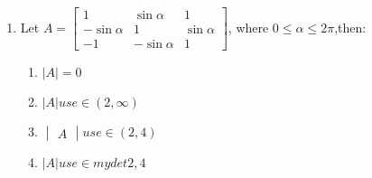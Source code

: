 \documentclass{article}
\providecommand{\myvec}[1]{\begin{bmatrix}#1\end{bmatrix}}
\providecommand{\mydet}[1]{\begin{vmatrix}#1\end{vmatrix}}
\begin{document}
\begin{enumerate}
    \item  Let $A =\myvec{1 & \sin\alpha & 1\\-\sin\alpha & 1 & \sin\alpha\\-1 & -\sin\alpha & 1}$, where $0 \leq \alpha \leq2\pi$,then: 
    \begin{enumerate}
        \item $|A|=0$
        \item $|A| use\in (2,\infty)$
        \item $\mydet{A} use\in (2,4)$
	\item $|A| use\in mydet{2,4}$
    \end{enumerate}
    
\end{enumerate}
\end{document}
